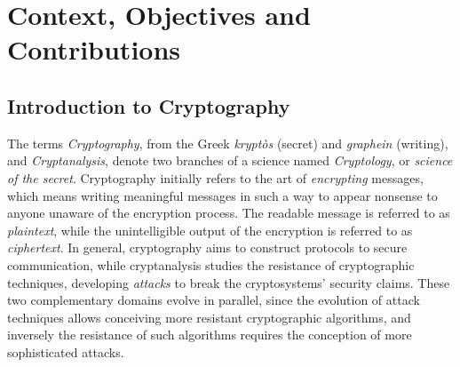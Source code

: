 
\chapter{Context, Objectives and Contributions} %

\label{ChapterIntroduction}


\section{Introduction to Cryptography}
The terms \emph{Cryptography}, from the Greek \emph{krypt\`os} (secret) and \emph{graphein} (writing), and \emph{Cryptanalysis}, denote two branches of a science named \emph{Cryptology}, or \emph{science of the secret}. Cryptography initially refers to the art of \emph{encrypting} messages, which means writing meaningful messages in such a way to appear nonsense to anyone unaware of the encryption process. The readable message is referred to as \emph{plaintext}, while the unintelligible output of the encryption is referred to as \emph{ciphertext}. In general, cryptography aims to construct protocols to secure communication, while cryptanalysis studies the resistance of cryptographic techniques, developing \emph{attacks} to break the cryptosystems' security claims. These two complementary domains evolve in parallel, since the evolution of attack techniques allows conceiving more resistant cryptographic algorithms, and inversely the resistance of such algorithms requires the conception of more sophisticated attacks.\\


